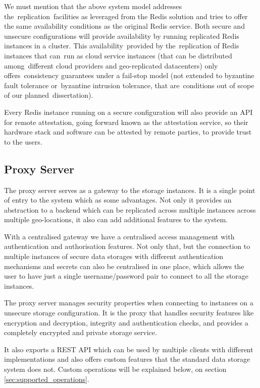 We must mention that the above system model addresses the replication facilities as leveraged from the Redis solution and tries to offer the same availability conditions as the original Redis service. Both secure and unsecure configurations will provide availability by running replicated Redis instances in a cluster. This availability provided by the replication of Redis instances that can run as cloud service instances (that can be distributed among different cloud providers and geo-replicated datacenters) only offers consistency guarantees under a fail-stop model (not extended to byzantine fault tolerance or byzantine intrusion tolerance, that are conditions out of scope of our planned dissertation).

Every Redis instance running on a secure configuration will also provide an API for remote attestation, going forward known as the attestation service, so their hardware stack and software can be attested by remote parties, to provide trust to the users.

\subsection{Proxy Server}
\label{ssec:system_model_proxy_server}

The proxy server serves as a gateway to the storage instances. It is a single point of entry to the system which as some advantages. Not only it provides an abstraction to a backend which can be replicated across multiple instances across multiple geo-locations, it also can add additional features to the system. 

With a centralised gateway we have a centralised access management with authentication and authorisation features. Not only that, but the connection to multiple instances of secure data storages with different authentication mechanisms and secrets can also be centralised in one place, which allows the user to have just a single username/password pair to connect to all the storage instances.

The proxy server manages security properties when connecting to instances on a unsecure storage configuration. It is the proxy that handles security features like encryption and decryption, integrity and authentication checks, and provides a completely encrypted and private storage service.

It also exports a \gls{REST} \gls{API} which can be used by multiple clients with different implementations and also offers custom features that the standard data storage system does not. Custom operations will be explained below, on section \ref{sec:supported_operations}.

